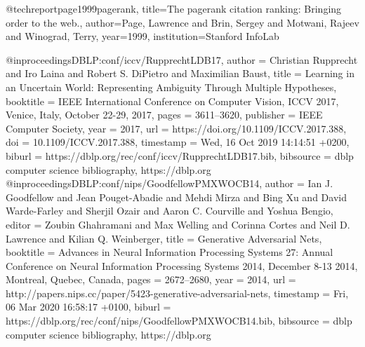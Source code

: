 @techreport{page1999pagerank,
  title={The pagerank citation ranking: Bringing order to the web.},
  author={Page, Lawrence and Brin, Sergey and Motwani, Rajeev and Winograd, Terry},
  year={1999},
  institution={Stanford InfoLab}
}

@inproceedings{DBLP:conf/iccv/RupprechtLDB17,
  author    = {Christian Rupprecht and
               Iro Laina and
               Robert S. DiPietro and
               Maximilian Baust},
  title     = {Learning in an Uncertain World: Representing Ambiguity Through Multiple
               Hypotheses},
  booktitle = {{IEEE} International Conference on Computer Vision, {ICCV} 2017, Venice,
               Italy, October 22-29, 2017},
  pages     = {3611--3620},
  publisher = {{IEEE} Computer Society},
  year      = {2017},
  url       = {https://doi.org/10.1109/ICCV.2017.388},
  doi       = {10.1109/ICCV.2017.388},
  timestamp = {Wed, 16 Oct 2019 14:14:51 +0200},
  biburl    = {https://dblp.org/rec/conf/iccv/RupprechtLDB17.bib},
  bibsource = {dblp computer science bibliography, https://dblp.org}
}
@inproceedings{DBLP:conf/nips/GoodfellowPMXWOCB14,
  author    = {Ian J. Goodfellow and
               Jean Pouget{-}Abadie and
               Mehdi Mirza and
               Bing Xu and
               David Warde{-}Farley and
               Sherjil Ozair and
               Aaron C. Courville and
               Yoshua Bengio},
  editor    = {Zoubin Ghahramani and
               Max Welling and
               Corinna Cortes and
               Neil D. Lawrence and
               Kilian Q. Weinberger},
  title     = {Generative Adversarial Nets},
  booktitle = {Advances in Neural Information Processing Systems 27: Annual Conference
               on Neural Information Processing Systems 2014, December 8-13 2014,
               Montreal, Quebec, Canada},
  pages     = {2672--2680},
  year      = {2014},
  url       = {http://papers.nips.cc/paper/5423-generative-adversarial-nets},
  timestamp = {Fri, 06 Mar 2020 16:58:17 +0100},
  biburl    = {https://dblp.org/rec/conf/nips/GoodfellowPMXWOCB14.bib},
  bibsource = {dblp computer science bibliography, https://dblp.org}
}